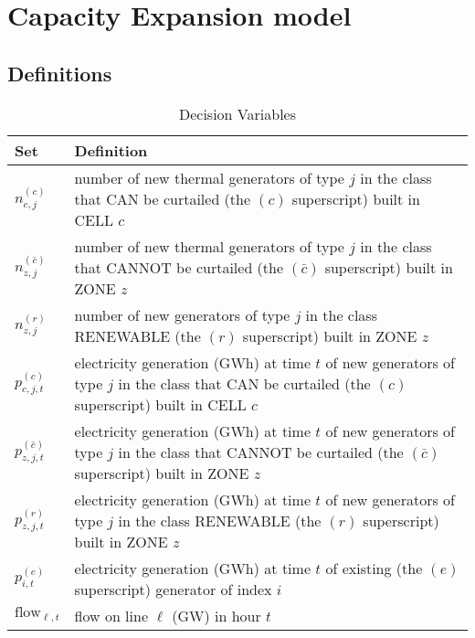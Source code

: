 \documentclass[11pt, oneside]{article}   	%
\newcommand{\flow}{\text{flow}}
\newcommand{\bc}{\bar{c}}
\begin{document}
\section{Capacity Expansion model}

\subsection{Definitions}

\begin{table}[H]
   \centering
   \caption{Decision Variables}
   \begin{tabular}{p{1in} p{4in} } %
      \toprule
      \textbf{Set} & \textbf{Definition} \\
      \midrule
      $n^{(c)}_{c, j}$ & number of new thermal generators of type $j$ in the class that CAN be curtailed (the $(c)$ superscript) built in CELL $c$\\
      $n^{(\bc)}_{z, j}$ & number of new thermal generators of type $j$ in the class that CANNOT be curtailed (the $(\bc)$ superscript) built in ZONE $z$\\
      $n^{(r)}_{z, j}$ & number of new generators of type $j$ in the class RENEWABLE (the $(r)$ superscript) built in ZONE $z$\\
      $p^{(c)}_{c, j, t}$ & electricity generation (GWh) at time $t$ of new generators  of type $j$ in the  class that CAN be curtailed (the $(c)$ superscript) built in CELL $c$\\
      $p^{(\bc)}_{z, j, t}$ & electricity generation (GWh) at time $t$ of new generators of type $j$ in the class that CANNOT be curtailed (the $(\bc)$ superscript) built in ZONE $z$\\
      $p^{(r)}_{z, j, t}$ & electricity generation (GWh) at time $t$ of new generators  of type $j$ in the class RENEWABLE (the $(r)$ superscript) built in ZONE $z$\\
      $p^{(e)}_{i, t}$ & electricity generation (GWh) at time $t$ of existing (the $(e)$ superscript) generator of index $i$ \\
      $\flow_{\ell, t}$ & flow on line $\ell$ (GW) in hour $t$\\
%
      \bottomrule
   \end{tabular}
   \label{tab:decision}
\end{table}
\end{document}
